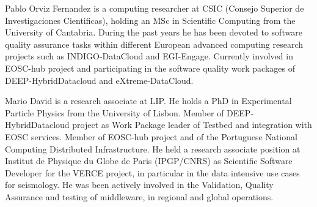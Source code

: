 \documentclass[journal]{IEEEtran}
\begin{document}
\begin{IEEEbiography}{Pablo Orviz Fernandez}
is a computing researcher at CSIC (Consejo Superior de Investigaciones
Cientificas), holding an MSc in Scientific Computing from the University of
Cantabria. During the past years he has been devoted to software quality
assurance tasks within different European advanced computing research projects
such as INDIGO-DataCloud and EGI-Engage. Currently involved in EOSC-hub project
and participating in the software quality work packages of DEEP-HybridDatacloud
and eXtreme-DataCloud.
\end{IEEEbiography}

\begin{IEEEbiography}{Mario David}
is a research associate at LIP. He holds a PhD in Experimental Particle Physics from the University of Lisbon.
Member of DEEP-HybridDatacloud project as Work Package leader of Testbed and integration with EOSC services. Member of EOSC-hub project and
of the Portuguese National Computing Distributed Infrastructure.
He held a research associate position at Institut de Physique du Globe de Paris (IPGP/CNRS) as Scientific Software Developer for the VERCE project, in particular in the data intensive use cases for seismology.
He was been actively involved in the Validation, Quality Assurance and testing of middleware, in regional and global operations.
\end{IEEEbiography}
\end{document}
